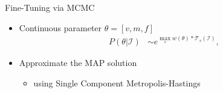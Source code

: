 \documentclass[serif,mathserif,final]{beamer}
\newcommand{\1}{\mathbb{I}} %
\begin{document}
\begin{frame}{}
\begin{columns}[t]
\begin{column}{0.23\linewidth}
      \begin{block}{Fine-Tuning via MCMC}
        \begin{itemize}
          \item Continuous parameter $\theta = [v, m, f]$
            \begin{align}
                P(\theta| \mathcal{I}) & \sim e^{ \max_{s} w(\theta) \ast
                  \mathcal{T}_s(\mathcal{I})},
            \end{align}
          \item Approximate the MAP solution
            \begin{itemize}
              \item using Single Component Metropolis-Hastings
            \end{itemize}
        \end{itemize}
      \end{block}


    \end{column}%



\end{columns}
\end{frame}
\end{document}

